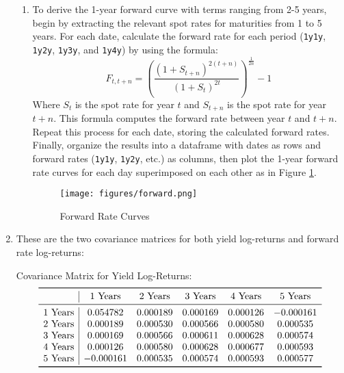 \documentclass{article}
\begin{document}
\begin{enumerate}
\begin{enumerate}
        \item To derive the 1-year forward curve with terms ranging from 2-5 years, begin by extracting the relevant spot rates for maturities from 1 to 5 years. For each date, calculate the forward rate for each period (\texttt{1y1y}, \texttt{1y2y}, \texttt{1y3y}, and \texttt{1y4y}) by using the formula:
        $$ F_{t, t+n}=\left(\frac{\left(1+S_{t+n}\right)^{2(t+n)}}{\left(1+S_t\right)^{2 t}}\right)^{\frac{1}{2 n}}-1 $$
        Where $S_t$ is the spot rate for year $t$ and $S_{t+n}$ is the spot rate for year $t+n$. This formula computes the forward rate between year $t$ and $t + n$. Repeat this process for each date, storing the calculated forward rates. Finally, organize the results into a dataframe with dates as rows and forward rates (\texttt{1y1y}, \texttt{1y2y}, etc.) as columns, then plot the 1-year forward rate curves for each day superimposed on each other as in Figure \ref{fig:forward}.

        \begin{figure} [h]
            \centering
            \texttt{[image: figures/forward.png]}
            \caption{Forward Rate Curves}
            \label{fig:forward}
        \end{figure}
            
        \end{enumerate}
        \item These are the two covariance matrices for both yield log-returns and forward rate log-returns:

        \centering Covariance Matrix for Yield Log-Returns:
        \[
        \begin{array}{r|ccccc}
        \toprule
         & \text{1 Years} & \text{2 Years} & \text{3 Years} & \text{4 Years} & \text{5 Years} \\
        \midrule
        \text{1 Years} & 0.054782 & 0.000189 & 0.000169 & 0.000126 & -0.000161 \\
        \text{2 Years} & 0.000189 & 0.000530 & 0.000566 & 0.000580 & 0.000535 \\
        \text{3 Years} & 0.000169 & 0.000566 & 0.000611 & 0.000628 & 0.000574 \\
        \text{4 Years} & 0.000126 & 0.000580 & 0.000628 & 0.000677 & 0.000593 \\
        \text{5 Years} & -0.000161 & 0.000535 & 0.000574 & 0.000593 & 0.000577 \\
        \bottomrule
        \end{array}
        \]
        

\end{enumerate}
\end{document}
